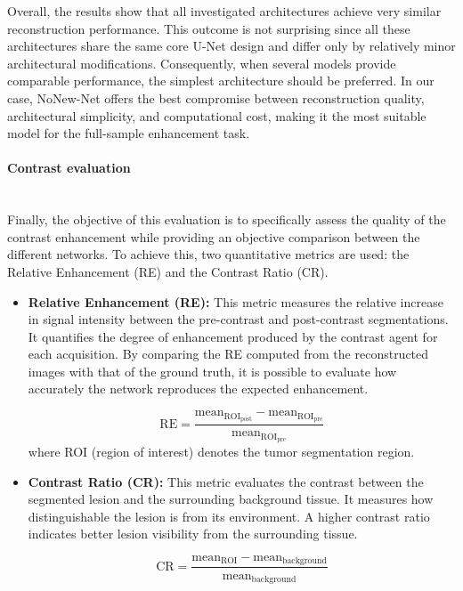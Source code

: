 \documentclass[12pt]{article}
\begin{document}
Overall, the results show that all investigated architectures achieve very similar reconstruction performance. 
This outcome is not surprising since all these architectures share the same core U-Net design and differ only by relatively minor architectural modifications.
Consequently, when several models provide comparable performance, the simplest architecture should be preferred.
In our case, NoNew-Net offers the best compromise between reconstruction quality, architectural simplicity, and computational cost, making it the most suitable model for the full-sample enhancement task.

\paragraph{Contrast evaluation}
\mbox{}\\

Finally, the objective of this evaluation is to specifically assess the quality of the contrast enhancement while providing an objective comparison between the different networks. 
To achieve this, two quantitative metrics are used: the Relative Enhancement (RE) and the Contrast Ratio (CR).

\begin{itemize}
    \item \textbf{Relative Enhancement (RE):} This metric measures the relative increase in signal intensity between the pre-contrast and post-contrast segmentations.
    It quantifies the degree of enhancement produced by the contrast agent for each acquisition. 
    By comparing the RE computed from the reconstructed images with that of the ground truth, it is possible to evaluate how accurately the network reproduces the expected enhancement.

    \[
    \mathrm{RE} = \frac{\mathrm{mean}_{\mathrm{ROI}_{\mathrm{post}}} - \mathrm{mean}_{\mathrm{ROI}_{\mathrm{pre}}}} {\mathrm{mean}_{\mathrm{ROI}_{\mathrm{pre}}}}
    \]
    where ROI (region of interest) denotes the tumor segmentation region.
    
    \item \textbf{Contrast Ratio (CR):} This metric evaluates the contrast between the segmented lesion and the surrounding background tissue. 
    It measures how distinguishable the lesion is from its environment. 
    A higher contrast ratio indicates better lesion visibility from the surrounding tissue.

    \[
    \mathrm{CR} = \frac{\mathrm{mean}_{\mathrm{ROI}} - \mathrm{mean}_{\mathrm{background}}} {\mathrm{mean}_{\mathrm{background}}}
    \]

\end{itemize}
\end{document}
